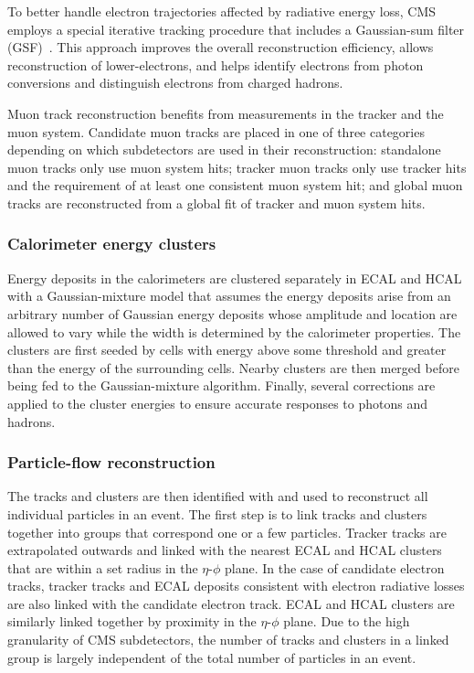 To better handle electron trajectories affected by radiative energy loss, CMS employs a special iterative tracking procedure that includes a Gaussian-sum filter (GSF)~\cite{gsf}. This approach improves the overall reconstruction efficiency, allows reconstruction of lower-\pt electrons, and helps identify electrons from photon conversions and distinguish electrons from charged hadrons.

Muon track reconstruction benefits from measurements in the tracker and the muon system. Candidate muon tracks are placed in one of three categories depending on which subdetectors are used in their reconstruction: standalone muon tracks only use muon system hits; tracker muon tracks only use tracker hits and the requirement of at least one consistent muon system hit; and global muon tracks are reconstructed from a global fit of tracker and muon system hits.

\subsubsection{Calorimeter energy clusters}
Energy deposits in the calorimeters are clustered separately in ECAL and HCAL with a Gaussian-mixture model that assumes the energy deposits arise from an arbitrary number of Gaussian energy deposits whose amplitude and location are allowed to vary while the width is determined by the calorimeter properties. The clusters are first seeded by cells with energy above some threshold and greater than the energy of the surrounding cells. Nearby clusters are then merged before being fed to the Gaussian-mixture algorithm. Finally, several corrections are applied to the cluster energies to ensure accurate responses to photons and hadrons.

\subsubsection{Particle-flow reconstruction}
The tracks and clusters are then identified with and used to reconstruct all individual particles in an event. The first step is to link tracks and clusters together into groups that correspond one or a few particles. Tracker tracks are extrapolated outwards and linked with the nearest ECAL and HCAL clusters that are within a set radius in the $\eta$-$\phi$ plane. In the case of candidate electron tracks, tracker tracks and ECAL deposits consistent with electron radiative losses are also linked with the candidate electron track. ECAL and HCAL clusters are similarly linked together by proximity in the $\eta$-$\phi$ plane. Due to the high granularity of CMS subdetectors, the number of tracks and clusters in a linked group is largely independent of the total number of particles in an event.

